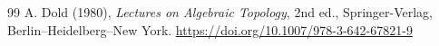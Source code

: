 
\begin{thebibliography}{99}
 A. Dold (1980), \emph{Lectures on Algebraic Topology}, 2nd ed., Springer-Verlag, Berlin–Heidelberg–New York.
\url{https://doi.org/10.1007/978-3-642-67821-9}

\end{thebibliography}
